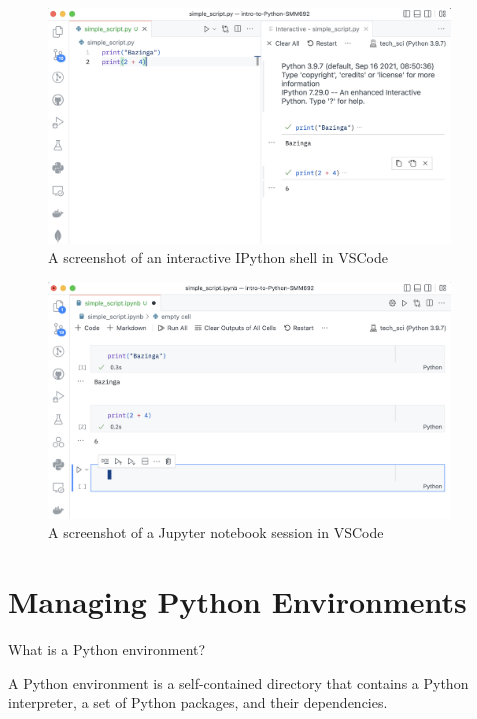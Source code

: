 \documentclass[a4paper,11pt]{book}
\newcommand{\question}[1]{%
    \begin{tcolorbox}[colback=comp_c!10,colframe=comp_c,sidebyside align=top,width=\linewidth,before skip=1ex]
        #1
    \end{tcolorbox}
    \switchcolumn%
}
\newcommand{\note}[1]{%
    \begin{tcolorbox}[colback=white!0,colframe=white!10,width=\linewidth,before skip=1ex]
        #1
    \end{tcolorbox}
}
\begin{document}
\begin{figure}[!htbp]
	\centering
	\includegraphics[width=0.95\textwidth]{vscode}
	\caption{A screenshot of an interactive IPython shell in VSCode}
	\label{fig:ipython_in_vscode}
\end{figure}	

\begin{figure}[!htbp]
	\centering
	\includegraphics[width=0.95\textwidth]{jupyter_in_vscode}
	\caption{A screenshot of a Jupyter notebook session in VSCode}
	\label{fig:jupyter_in_vscode}
\end{figure}	
\clearpage

\section{Managing Python Environments}

\begin{paracol}{2}
	\question{\raggedright What is a Python environment?}
	\note{A Python environment is a self-contained directory that contains a Python interpreter, a set of Python packages, and their dependencies.
	}
\end{paracol}
\end{document}
